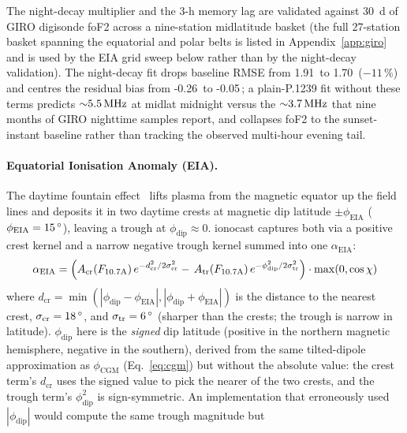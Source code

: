 \documentclass[11pt,a4paper]{article}
\newcommand{\SI}[2]{#1\,\text{#2}}
\newcommand{\MHz}{\text{MHz}}
\newcommand{\degree}{\ensuremath{{}^\circ}}
\begin{document}
The night-decay multiplier and the 3-h memory lag are validated
against 30~d of GIRO digisonde foF2 across a nine-station
midlatitude basket (the full 27-station basket
spanning the equatorial and polar belts is listed in
Appendix~\ref{app:giro} and is used by the EIA grid sweep below
rather than by the night-decay validation).  The night-decay
fit drops baseline RMSE from \SI{1.91}{\MHz} to
\SI{1.70}{\MHz} ($-11\,\%$) and centres the residual bias from
\SI{-0.26}{\MHz} to \SI{-0.05}{\MHz}; a plain-P.1239
fit without these terms predicts ${\sim}\SI{5.5}{\MHz}$ at
midlat midnight versus
the ${\sim}\SI{3.7}{\MHz}$ that nine months of GIRO
nighttime samples report, and collapses foF2 to the
sunset-instant baseline rather than tracking the observed
multi-hour evening tail.

\paragraph{Equatorial Ionisation Anomaly (EIA).}  The daytime
fountain
effect~\cite{anderson1981} lifts plasma from the magnetic equator up
the field lines and deposits it in two daytime crests at magnetic dip
latitude $\pm \phi_{\text{EIA}}$ ($\phi_{\text{EIA}} =
\SI{15}{\degree}$), leaving a trough at $\phi_{\text{dip}} \approx 0$.
ionocast captures both via a positive crest kernel and a narrow
negative trough kernel summed into one $\alpha_{\text{EIA}}$:
\begin{equation}\label{eq:eia}
  \alpha_{\text{EIA}} =
    \Bigl(A_{\text{cr}}(F_{10.7\text{A}})\,
      e^{-d_{\text{cr}}^2 / 2\sigma_{\text{cr}}^2}
    -\,A_{\text{tr}}(F_{10.7\text{A}})\,
      e^{-\phi_{\text{dip}}^2 / 2\sigma_{\text{tr}}^2}\Bigr)
    \cdot\max(0,\cos\chi)
\end{equation}
where $d_{\text{cr}} = \min(|\phi_{\text{dip}} - \phi_{\text{EIA}}|,
|\phi_{\text{dip}} + \phi_{\text{EIA}}|)$ is the distance to the
nearest crest, $\sigma_{\text{cr}} = \SI{18}{\degree}$, and
$\sigma_{\text{tr}} = \SI{6}{\degree}$ (sharper than the crests; the
trough is narrow in latitude).  $\phi_{\text{dip}}$ here is the
\emph{signed} dip latitude (positive in the northern magnetic
hemisphere, negative in the southern), derived from the same
tilted-dipole approximation as $\phi_{\text{CGM}}$
(Eq.~\ref{eq:cgm}) but without the absolute value: the crest term's
$d_{\text{cr}}$ uses the signed value to pick the nearer of the
two crests, and the trough term's $\phi_{\text{dip}}^2$ is
sign-symmetric.  An implementation that erroneously used
$|\phi_{\text{dip}}|$ would compute the same trough magnitude but
\end{document}
